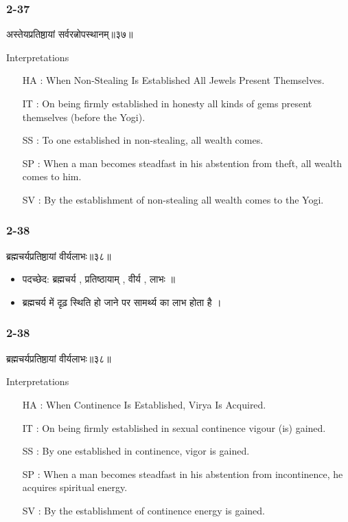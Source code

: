\begin{frame}[fragile]\frametitle{2-37}
\begin{sanskrit}
अस्तेयप्रतिष्ठायां सर्वरत्नोपस्थानम्॥३७॥
\end{sanskrit}

Interpretations
\begin{itemize}
\item [HA]: When Non-Stealing Is Established All Jewels Present Themselves.
\item [IT]: On being firmly established in honesty all kinds of gems present themselves (before the Yogi).
\item [SS]: To one established in non-stealing, all wealth comes.
\item [SP]: When a man becomes steadfast in his abstention from theft, all wealth comes to him.
\item [SV]: By the establishment of non-stealing all wealth comes to the Yogi. 
\end{itemize}
\end{frame}


\begin{frame}[fragile]\frametitle{2-38}
\begin{sanskrit}
ब्रह्मचर्यप्रतिष्ठायां वीर्यलाभः॥३८॥
\end{sanskrit}

\begin{itemize}
\item पदच्छेद: ब्रह्मचर्य , प्रतिष्ठायाम् , वीर्य , लाभः ॥
\item ब्रह्मचर्य में दृढ़ स्थिति हो जाने पर सामर्थ्य का लाभ होता है ।
\end{itemize}	
	
\end{frame}


\begin{frame}[fragile]\frametitle{2-38}
\begin{sanskrit}
ब्रह्मचर्यप्रतिष्ठायां वीर्यलाभः॥३८॥
\end{sanskrit}

Interpretations
\begin{itemize}
\item [HA]: When Continence Is Established, Virya Is Acquired.
\item [IT]: On being firmly established in sexual continence vigour (is) gained.
\item [SS]: By one established in continence, vigor is gained.
\item [SP]: When a man becomes steadfast in his abstention from incontinence, he acquires spiritual energy.
\item [SV]: By the establishment of continence energy is gained. 
\end{itemize}
\end{frame}


